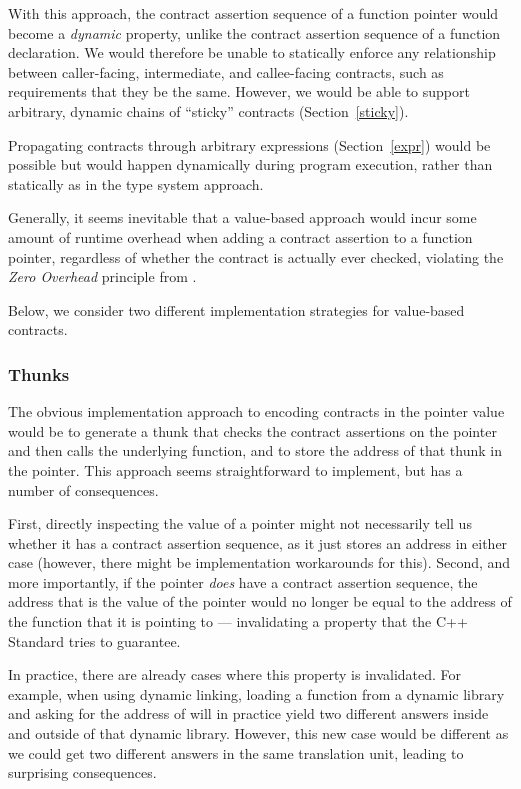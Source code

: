 With this approach, the contract assertion sequence of a function pointer would become a \emph{dynamic} property, unlike the contract assertion sequence of a function declaration. We would therefore be unable to statically enforce any relationship between caller-facing, intermediate, and callee-facing contracts, such as requirements that they be the same. However, we would be able to support arbitrary, dynamic chains of ``sticky'' contracts (Section~\ref{sticky}). 

Propagating contracts through arbitrary expressions (Section~\ref{expr}) would be possible but would happen dynamically during program execution, rather than statically as in the type system approach.

Generally, it seems inevitable that a value-based approach would incur some amount of runtime overhead when adding a contract assertion to a function pointer, regardless of whether the contract is actually ever checked, violating the \emph{Zero Overhead} principle from \cite{P2900R9}.

Below, we consider two different implementation strategies for value-based contracts.

\subsubsection{Thunks}
\label{thunks}

The obvious implementation approach to encoding contracts in the pointer value would be to generate a thunk that checks the contract assertions on the pointer and then calls the underlying function, and to store the address of that thunk in the pointer. This approach seems straightforward to implement, but has a number of consequences.

First, directly inspecting the value of a pointer might not necessarily tell us whether it has a contract assertion sequence, as it just stores an address in either case (however, there might be implementation workarounds for this). Second, and more importantly, if the pointer \emph{does} have a contract assertion sequence, the address that is the value of the pointer would no longer be equal to the address of the function that it is pointing to --- invalidating a property that the C++ Standard tries to guarantee.

In practice, there are already cases where this property is invalidated. For example, when using dynamic linking, loading a function  from a dynamic library and asking for the address of  will in practice yield two different answers inside and outside of that dynamic library. However, this new case would be different as we could get two different answers in the same translation unit, leading to surprising consequences.

